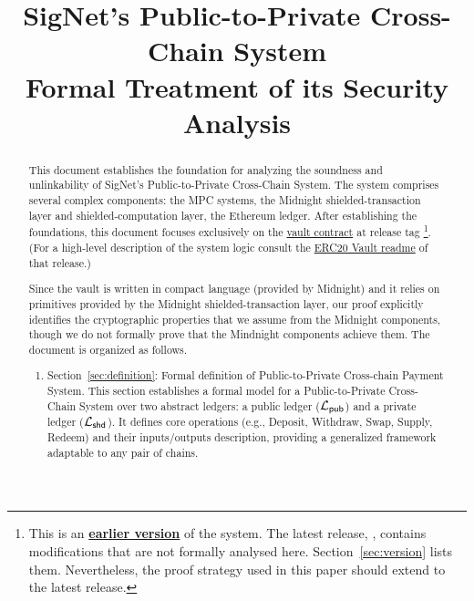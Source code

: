 \documentclass[11pt]{article}
\begin{document}
\title{SigNet's Public-to-Private Cross-Chain \Payment{} System\\[2pt]
  {\large\mdseries Formal Treatment of its Security Analysis}}

\maketitle
{}\par\vspace{\baselineskip}
\begin{abstract}
    This document establishes the foundation for analyzing the soundness and unlinkability of SigNet’s Public-to-Private Cross-Chain System.  The system comprises several complex components: the MPC systems, the Midnight  shielded-transaction layer and shielded-computation layer, the Ethereum ledger.
    After establishing the foundations, this document  focuses exclusively on the  \href{\analysedContractUrl}{vault contract} at release tag \texttt{\analysedTag}\footnote{This is an \href{\analysedContractUrl}{\textbf{earlier version}} of the system. The latest release, \href{\latestContractUrl}{\texttt{\latestTag}}, contains modifications that are not formally analysed here. Section~\ref{sec:version} lists them. Nevertheless, the proof strategy used in this paper should extend to the latest release.}.
    (For a high-level description of the system logic consult the
   \href{\analysedReadmeUrl}{ERC20 Vault readme} of that release.)

     Since the vault is written in compact language (provided by Midnight) and it relies on primitives provided by the Midnight shielded-transaction layer, our proof explicitly identifies the cryptographic properties that we assume from the Midnight components, though we do not formally prove that the Mindnight components achieve them.
    The document is organized as follows.

    \begin{enumerate}
        \item   Section~\ref{sec:definition}: Formal definition of  Public-to-Private Cross-chain Payment System.
       This section establishes a formal model for a Public-to-Private Cross-Chain \Payment{} System over two abstract ledgers: a public ledger ($\mathcal{L}_{\mathsf{pub}}$) and a private ledger ($\mathcal{L}_{\mathsf{shd}}$). It defines core operations (e.g., Deposit, Withdraw, Swap, Supply, Redeem) and their inputs/outputs description, providing a generalized framework adaptable to any pair of chains.


\end{enumerate}
\end{abstract}
\end{document}
